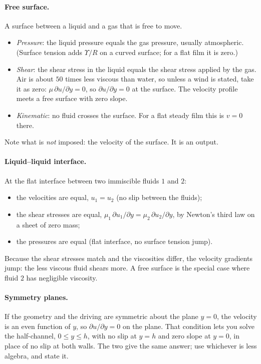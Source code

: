 \paragraph{Free surface.} A surface between a liquid and a gas that is free to move.
\begin{itemize}[nosep,leftmargin=*]
\item \emph{Pressure}: the liquid pressure equals the gas pressure, usually atmospheric. (Surface tension adds $\Upsilon/R$ on a curved surface; for a flat film it is zero.)
\item \emph{Shear}: the shear stress in the liquid equals the shear stress applied by the gas. Air is about $50$ times less viscous than water, so unless a wind is stated, take it as zero: $\mu\,\partial u/\partial y = 0$, so $\partial u/\partial y = 0$ at the surface. The velocity profile meets a free surface with zero slope.
\item \emph{Kinematic}: no fluid crosses the surface. For a flat steady film this is $v = 0$ there.
\end{itemize}
Note what is \emph{not} imposed: the velocity of the surface. It is an output.

\paragraph{Liquid--liquid interface.} At the flat interface between two immiscible fluids $1$ and $2$:
\begin{itemize}[nosep,leftmargin=*]
\item the velocities are equal, $u_1 = u_2$ (no slip between the fluids);
\item the shear stresses are equal, $\mu_1\,\partial u_1/\partial y = \mu_2\,\partial u_2/\partial y$, by Newton's third law on a sheet of zero mass;
\item the pressures are equal (flat interface, no surface tension jump).
\end{itemize}
Because the shear stresses match and the viscosities differ, the velocity gradients jump: the less viscous fluid shears more. A free surface is the special case where fluid $2$ has negligible viscosity.

\paragraph{Symmetry planes.} If the geometry and the driving are symmetric about the plane $y = 0$, the velocity is an even function of $y$, so $\partial u/\partial y = 0$ on the plane. That condition lets you solve the half-channel, $0 \le y \le h$, with no slip at $y = h$ and zero slope at $y = 0$, in place of no slip at both walls. The two give the same answer; use whichever is less algebra, and state it.

